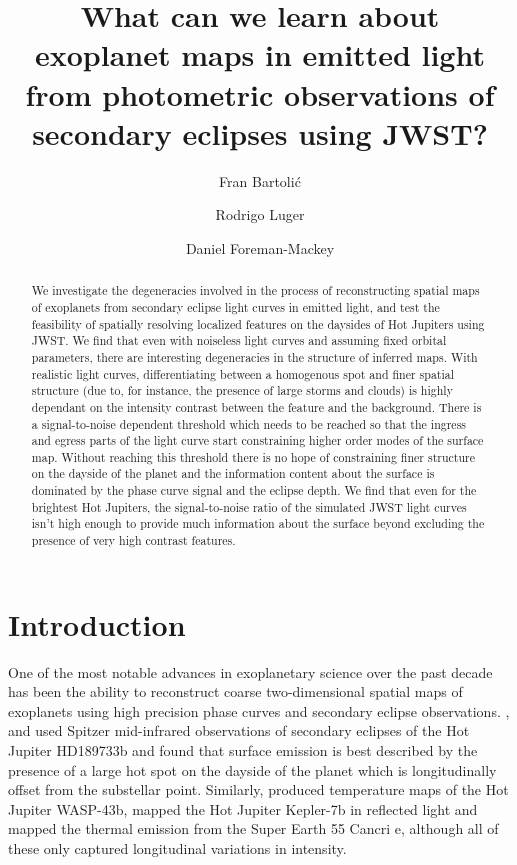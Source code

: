 \documentclass[modern]{aastex631}
\begin{document}
\title{
    \vspace{-3em}
    \textbf{
        What can we learn about exoplanet maps in emitted light from photometric observations of secondary eclipses using JWST?
    }
}
\author[0000-0001-8630-9794]{Fran Bartoli\'c}
\author[0000-0002-0296-3826]{Rodrigo Luger}
\author[0000-0002-9328-5652]{Daniel Foreman-Mackey}
%

\begin{abstract}
We investigate the degeneracies involved in the process of reconstructing spatial maps of 
exoplanets from secondary eclipse light curves in emitted light, and test the feasibility of 
spatially resolving localized features on the daysides of Hot Jupiters using JWST.
We find that even with noiseless light curves and assuming fixed orbital parameters, there are 
interesting degeneracies in the structure of inferred maps. 
With realistic light curves, differentiating between a homogenous spot and finer spatial 
structure (due to, for instance, the presence of large storms and clouds) is highly dependant 
on the intensity contrast between the feature and the background. 
There is a signal-to-noise dependent threshold which needs to be reached so that the ingress 
and egress parts of the light curve start constraining higher order modes of the surface map.
Without reaching this threshold there is no hope of constraining finer structure on the dayside
of the planet and the information content about the surface is dominated by the phase curve 
signal and the eclipse depth.
We find that even for the brightest Hot Jupiters, the signal-to-noise 
ratio of the simulated JWST light curves isn't high enough to provide much information about 
the surface beyond excluding the presence of very high contrast features.
\end{abstract}

\section{Introduction}
\label{sec:introduction}
One of the most notable advances in exoplanetary science over the past decade has been the ability
to reconstruct coarse two-dimensional spatial maps of exoplanets using high precision phase 
curves and secondary eclipse observations.
\cite{knutson2007}, \cite{majeau2012b} and \cite{dewit2012} used Spitzer mid-infrared observations 
of secondary eclipses of the Hot Jupiter HD189733b and found that surface emission is best 
described by the presence of a large hot spot on the dayside of the planet which is 
longitudinally offset from the substellar point. 
Similarly, \cite{stevenson2014} produced temperature maps of the Hot Jupiter WASP-43b, 
\cite{demory2013} mapped the Hot Jupiter Kepler-7b in reflected light and \cite{demory2016a} 
mapped the thermal emission from the Super Earth 55 Cancri e, although all of these only 
captured longitudinal variations in intensity.
\end{document}
